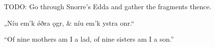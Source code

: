 
TODO: Go through Snorre’s Edda and gather the fragments thence.

\bva „Níu em’k ǿðra ǫgr, &
níu em’k ystra onr.“\eva

\bvb “Of nine mothers am I a lad, of nine sisters am I a son.”\evb
\evg
